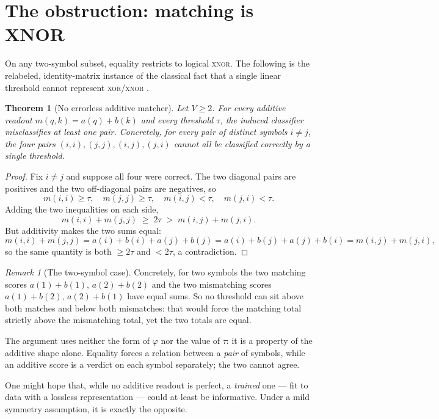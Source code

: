 \documentclass[11pt]{article}
\theoremstyle{plain}
\newtheorem{theorem}{Theorem}
\theoremstyle{definition}
\theoremstyle{remark}
\newtheorem{remark}{Remark}
\begin{document}
\section{The obstruction: matching is XNOR}
\label{sec:impossibility}

On any two-symbol subset, equality restricts to logical \textsc{xnor}. The following is the relabeled, identity-matrix instance of the classical fact that a single linear threshold cannot represent \textsc{xor}/\textsc{xnor} \cite{minsky1969}.

\begin{theorem}[No errorless additive matcher]
\label{thm:obstruction}
Let $V \geq 2$. For every additive readout $m(q,k) = a(q) + b(k)$ and every threshold $\tau$, the induced classifier misclassifies at least one pair. Concretely, for every pair of distinct symbols $i \neq j$, the four pairs $(i,i),(j,j),(i,j),(j,i)$ cannot all be classified correctly by a single threshold.
\end{theorem}

\begin{proof}
Fix $i \neq j$ and suppose all four were correct. The two diagonal pairs are positives and the two off-diagonal pairs are negatives, so
\[
m(i,i) \geq \tau, \quad m(j,j) \geq \tau, \quad m(i,j) < \tau, \quad m(j,i) < \tau .
\]
Adding the two inequalities on each side,
\[
m(i,i) + m(j,j) \;\geq\; 2\tau \;>\; m(i,j) + m(j,i).
\]
But additivity makes the two sums equal:
\[
m(i,i) + m(j,j) = a(i)+b(i)+a(j)+b(j) = a(i)+b(j)+a(j)+b(i) = m(i,j)+m(j,i),
\]
so the same quantity is both $\geq 2\tau$ and $< 2\tau$, a contradiction.
\end{proof}

\begin{remark}[The two-symbol case]
Concretely, for two symbols the two matching scores $a(1)+b(1),\,a(2)+b(2)$ and the two mismatching scores $a(1)+b(2),\,a(2)+b(1)$ have equal sums. So no threshold can sit above both matches and below both mismatches: that would force the matching total strictly above the mismatching total, yet the two totals are equal.
\end{remark}

The argument uses neither the form of $\varphi$ nor the value of $\tau$: it is a property of the additive shape alone. Equality forces a relation between a \emph{pair} of symbols, while an additive score is a verdict on each symbol separately; the two cannot agree.

One might hope that, while no additive readout is perfect, a \emph{trained} one --- fit to data with a lossless representation --- could at least be informative. Under a mild symmetry assumption, it is exactly the opposite.
\end{document}
